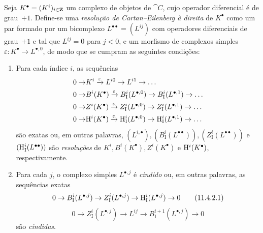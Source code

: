 \begin{env}[11.4.2]
\label{0.11.4.2}
Seja $K^\bullet = (K^i)_{i\in\mathbf{Z}}$ um complexo de objetos de $\cat{C}$, cujo operador diferencial é de grau~$+1$.
Define-se uma \emph{resolução de Cartan--Eilenberg à direita} de $K^\bullet$ como um par formado por um bicomplexo $L^{\bullet\bullet} = (L^{ij})$ com operadores diferenciais de grau~$+1$ e tal que $L^{ij}=0$ para $j<0$, e um morfismo de complexos simples $\varepsilon: K^\bullet \rightarrow L^{\bullet, 0}$, de modo que se cumpram as seguintes condições:
\begin{enumerate}
  \item[(i) ] Para cada índice $i$, as sequências
    \[
      \begin{aligned}
        0 \rightarrow
        & K^i
        \xrightarrow{\varepsilon} L^{i0}
        \rightarrow L^{i1}
        \rightarrow \ldots
      \\0 \rightarrow
        & B^i(K^\bullet)
        \xrightarrow{\varepsilon} B_\mathrm{I}^i(L^{\bullet,0})
        \rightarrow B_\mathrm{I}^i(L^{\bullet,1})
        \rightarrow \ldots
      \\0 \rightarrow
        & Z^i(K^\bullet)
        \xrightarrow{\varepsilon} Z_\mathrm{I}^i(L^{\bullet,0})
        \rightarrow Z_\mathrm{I}^i(L^{\bullet,1})
        \rightarrow \ldots
      \\0 \rightarrow
        & \mathrm{H}^i(K^\bullet)
        \xrightarrow{\varepsilon} \mathrm{H}_\mathrm{I}^i(L^{\bullet,0})
        \rightarrow \mathrm{H}_\mathrm{I}^i(L^{\bullet,1})
        \rightarrow \ldots
      \end{aligned}
    \]
    são exatas ou, em outras palavras, $(L^{i,\bullet}), (B_\mathrm{I}^i(L^{\bullet\bullet})), (Z_\mathrm{I}^i(L^{\bullet\bullet}))$ e $(\mathrm{H}_\mathrm{I}^i(L^{\bullet\bullet}))$ são \emph{resoluções} de $K^i, B^i(K^\bullet), Z^i(K^\bullet)$ e $\mathrm{H}^i(K^\bullet)$, respectivamente.
  \item[(ii) ] Para cada $j$, o complexo simples $L^{\bullet, j}$ é \emph{cindido} ou, em outras palavras, as sequências exatas
    \[
      \label{0.11.4.2.1}
      0 \rightarrow B_\mathrm{I}^i(L^{\bullet,j}) \rightarrow Z_\mathrm{I}^i(L^{\bullet,j}) \rightarrow \HH_\mathrm{I}^i(L^{\bullet,j}) \rightarrow 0
      \tag{11.4.2.1}
    \]
    \[
      \label{0.11.4.2.2}
      0 \rightarrow Z_\mathrm{I}^i(L^{\bullet,j}) \rightarrow L^{ij} \rightarrow B_\mathrm{I}^{i+1}(L^{\bullet,j}) \rightarrow 0
      \tag{11.4.2.2}
    \]
    são \emph{cindidas}.
\end{enumerate}


\end{env}
